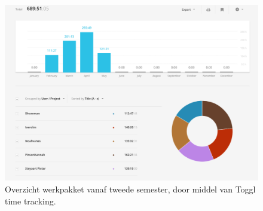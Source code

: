 \documentclass{article}
\begin{document}
\begin{figure}[h!]
\centering
 \centerline{\includegraphics[scale=0.4]{toggl_tweede_semester.pdf}}
 \caption{Overzicht werkpakket vanaf tweede semester, door middel van Toggl time tracking. }
 \label{fig:overzicht}
\end{figure}
\end{document}
